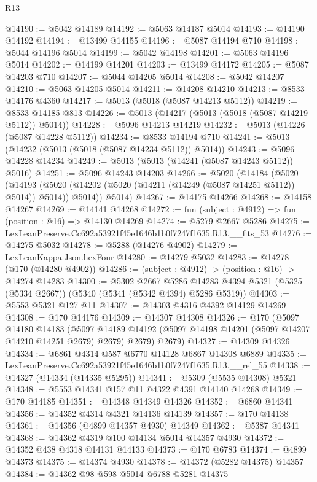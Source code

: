 \begin{lexlean}{R13}
\begin{coremodule}
@14190 := @5042 @14189
@14192 := @5063 @14187 @5014
@14193 := @14190 @14192
@14194 := @13499 @14155
@14196 := @5087 @14194 @710
@14198 := @5044 @14196 @5014
@14199 := @5042 @14198
@14201 := @5063 @14196 @5014
@14202 := @14199 @14201
@14203 := @13499 @14172
@14205 := @5087 @14203 @710
@14207 := @5044 @14205 @5014
@14208 := @5042 @14207
@14210 := @5063 @14205 @5014
@14211 := @14208 @14210
@14213 := @8533 @14176 @4360
@14217 := @5013 (@5018 (@5087 @14213 @5112))
@14219 := @8533 @14185 @813
@14226 := @5013 (@14217 (@5013 (@5018 (@5087 @14219 @5112)) @5014))
@14228 := @5096 @14213 @14219
@14232 := @5013 (@14226 (@5087 @14228 @5112))
@14234 := @8533 @14194 @710
@14241 := @5013 (@14232 (@5013 (@5018 (@5087 @14234 @5112)) @5014))
@14243 := @5096 @14228 @14234
@14249 := @5013 (@5013 (@14241 (@5087 @14243 @5112)) @5016)
@14251 := @5096 @14243 @14203
@14266 := @5020
    (@14184
      (@5020
        (@14193 (@5020 (@14202 (@5020 (@14211 (@14249 (@5087 @14251 @5112)) @5014)) @5014)) @5014))
      @5014)
@14267 := @14175 @14266
@14268 := @14158 @14267
@14269 := @14141 @14268
@14272 := fun (subject : @4912) => fun (position : @16) => @14130 @14269
@14274 := @5279 @2667 @5286
@14275 := LexLeanPreserve.Cc692a53921f45e1646b1b0f7247f1635.R13.__fits_53
@14276 := @14275 @5032
@14278 := @5288 (@14276 @4902)
@14279 := LexLeanKappa.Json.hexFour
@14280 := @14279 @5032
@14283 := @14278 (@170 (@14280 @4902))
@14286 := (subject : @4912) -> (position : @16) -> @14274 @14283
@14300 := @5302
    @2667
    @5286
    @14283
    @4394
    @5321
    (@5325 (@5334 @2667))
    (@5340 (@5341 (@5342 @4394) @5286 @5319))
@14303 := @5553 @5321 @127 @11
@14307 := @14303 @4316 @4392 @14129 @14269
@14308 := @170 @14176
@14309 := @14307 @14308
@14326 := @170
    (@5097
      @14180
      @14183
      (@5097 @14189 @14192 (@5097 @14198 @14201 (@5097 @14207 @14210 @14251 @2679) @2679) @2679)
      @2679)
@14327 := @14309 @14326
@14334 := @6861 @4314 @587 @6770 @14128 @6867 @14308 @6889
@14335 := LexLeanPreserve.Cc692a53921f45e1646b1b0f7247f1635.R13.__rel_55
@14338 := @14327 (@14334 (@14335 @5295))
@14341 := @5309 (@5535 @14308) @5321
@14348 := @5553 @14341 @157 @11 @4322 @4391 @14140 @14268
@14349 := @170 @14185
@14351 := @14348 @14349 @14326
@14352 := @6860 @14341
@14356 := @14352 @4314 @4321 @14136 @14139
@14357 := @170 @14138
@14361 := @14356 (@4899 @14357 @4930) @14349
@14362 := @5387 @14341
@14368 := @14362 @4319 @100 @14134 @5014 @14357 @4930
@14372 := @14352 @438 @4318 @14131 @14133
@14373 := @170 @6783
@14374 := @4899 @14373
@14375 := @14374 @4930
@14378 := @14372 (@5282 @14375) @14357
@14384 := @14362 @98 @598 @5014 @6788 @5281 @14375

\end{coremodule}
\end{lexlean}

